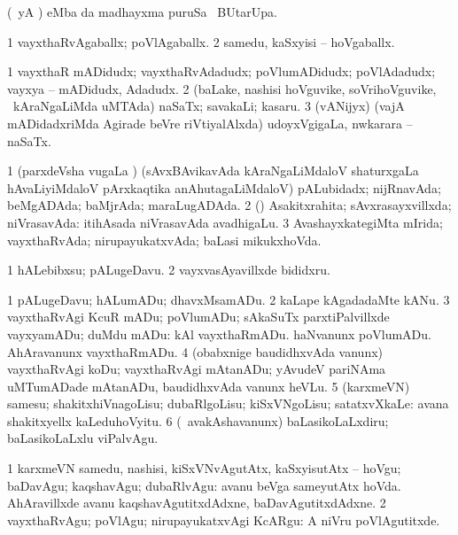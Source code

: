 {\bentry
{} 
\gl{\kirx}
\expl{}
\bmng
(\pArxparx\ yA \pArxM)  eMba \kirx da madhayxma puruSa \Eva\ BUtarUpa. 
\emng
\eentry

\bentry
{} 
\gl{\gu}
\expl{}
\bmng
\bnum
\num{1} vayxthaRvAgaballx; poVlAgaballx. 
\num{2} samedu, kaSxyisi -- hoVgaballx. 
\enum
\emng
\eentry

\bentry
{} 
\gl{\nA}
\expl{}
\bmng
\bnum
\num{1} vayxthaR mADidudx; vayxthaRvAdadudx; poVlumADidudx; poVlAdadudx; vayxya -- mADidudx, Adadudx. 
\num{2} (baLake, nashisi hoVguvike, soVrihoVguvike, \mo\ kAraNgaLiMda uMTAda) naSaTx; savakaLi; kasaru. 
\num{3} (vANijyx) (vajA mADidadxriMda Agirade beVre riVtiyalAlxda) udoyxVgigaLa, nwkarara -- naSaTx. 
\enum
\emng
\eentry

\bentry
{} 
\gl{\gu}
\expl{}
\bmng
\bnum
\num{1} (parxdeVsha \mo vugaLa \vi) (sAvxBAvikavAda kAraNgaLiMdaloV shaturxgaLa hAvaLiyiMdaloV pArxkaqtika anAhutagaLiMdaloV) pALubidadx; nijRnavAda; beMgADAda; baMjrAda; maraLugADAda. 
\num{2} (\rUpa) Asakitxrahita; sAvxrasayxvillxda; niVrasavAda:  itihAsada niVrasavAda avadhigaLu. 
\num{3} AvashayxkategiMta mIrida; vayxthaRvAda; nirupayukatxvAda; baLasi mikukxhoVda. 
\enum
\emng

\noindent
\gl{\pagu}
\expl{}
\bmng
\bnum
\num{1}  hALebibxsu; pALugeDavu. 
\num{2}  vayxvasAyavillxde bididxru. 
\enum
\emng
\eentry

\bentry
{} 
\gl{\sakirx}
\expl{}
\bmng
\bnum
\num{1} pALugeDavu; hALumADu; dhavxMsamADu. 
\num{2} kaLape kAgadadaMte kANu. 
\num{3} vayxthaRvAgi KcuR mADu; poVlumADu; sAkaSuTx parxtiPalvillxde vayxyamADu; duMdu mADu:  kAl vayxthaRmADu.  haNvanunx poVlumADu.  AhAravanunx vayxthaRmADu. 
\num{4} (obabxnige baudidhxvAda \mo vanunx) vayxthaRvAgi koDu; vayxthaRvAgi mAtanADu; yAvudeV pariNAma uMTumADade mAtanADu, baudidhxvAda \mo vanunx heVLu. 
\num{5} (karxmeVN) samesu; shakitxhiVnagoLisu; dubaRlgoLisu; kiSxVNgoLisu; satatxvXkaLe:  avana shakitxyellx kaLeduhoVyitu. 
\num{6} (\kanmu\ avakAshavanunx) baLasikoLaLxdiru; baLasikoLaLxlu viPalvAgu. 
\enum
\emng

\noindent 
\gl{\akirx}
\expl{}
\bmng
\bnum
\num{1} karxmeVN samedu, nashisi, kiSxVNvAgutAtx, kaSxyisutAtx -- hoVgu; baDavAgu; kaqshavAgu; dubaRlvAgu:  avanu beVga sameyutAtx hoVda.  AhAravillxde avanu kaqshavAgutitxdAdxne, baDavAgutitxdAdxne. 
\num{2} vayxthaRvAgu; poVlAgu; nirupayukatxvAgi KcARgu:  A niVru poVlAgutitxde. 
\enum
\emng

}
